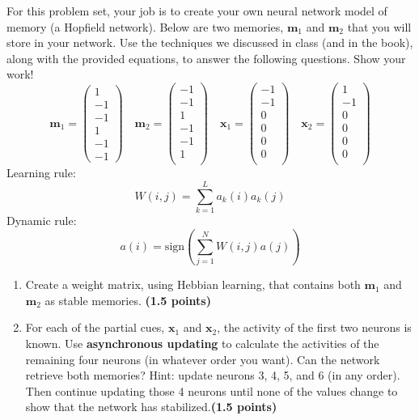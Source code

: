 \documentclass[11pt]{article}
\begin{document}
For this problem set, your job is to create your own neural
  network model of memory (a Hopfield network).  Below are two
  memories, $\mathbf{m}_1$ and $\mathbf{m}_2$ that you will store in
  your network.  Use the techniques we discussed in class (and in
  the book), along with the provided equations, to answer the
  following questions.  Show your work!
\[
  \mathbf{m}_1=
  \begin{pmatrix}
    1\\
    -1\\
    -1\\
    1\\
    -1\\
    -1
  \end{pmatrix}\quad
  \mathbf{m}_2=
  \begin{pmatrix}
    -1\\
    -1\\
    1\\
    -1\\
    -1\\
    1\\
  \end{pmatrix}\quad
\mathbf{x}_1=
  \begin{pmatrix}
    -1\\
    -1\\
    0\\
    0\\
    0\\
    0\\
  \end{pmatrix}\quad
\mathbf{x}_2=
  \begin{pmatrix}
    1\\
    -1\\
    0\\
    0\\
    0\\
    0\\
  \end{pmatrix}
\]
Learning rule:
\[
W(i,j) = \sum_{k = 1}^L a_k(i)a_k(j)
\]
Dynamic rule:
\[
a(i) = \mathrm{sign}\left(\sum_{j=1}^N W(i,j)a(j)\right)
\]

\begin{enumerate}
\item Create a weight matrix, using Hebbian learning, that contains
  both $\mathbf{m}_1$ and $\mathbf{m}_2$ as stable memories.
  \textbf{(1.5 points)}

\item For each of the partial cues, $\mathbf{x}_1$ and $\mathbf{x}_2$,
  the activity of the first two neurons is known.  Use
  \textbf{asynchronous updating} to calculate the activities of the
  remaining four neurons (in whatever order you want).  Can the
  network retrieve both memories?  Hint: update neurons 3, 4, 5, and 6
  (in any order).  Then continue updating those 4 neurons until none of the
  values change to show that the network has stabilized.\textbf{(1.5 points)}
\end{enumerate}
\end{document}
